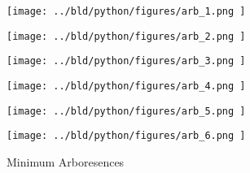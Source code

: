 \documentclass[11pt, a4paper, leqno]{article}
\begin{document}
\newpage

\begin{figure}
    \centering
    \begin{minipage}{.5\textwidth}
        \centering
        \texttt{[image: ../bld/python/figures/arb\_1.png
        ]}
        \label{fig:arb2}
    \end{minipage}%
    \begin{minipage}{.5\textwidth}
        \centering
        \texttt{[image: ../bld/python/figures/arb\_2.png
        ]}
        \label{fig:arb3}
    \end{minipage}

    \centering
    \begin{minipage}{.5\textwidth}
        \centering
        \texttt{[image: ../bld/python/figures/arb\_3.png
        ]}
        \label{fig:arb4}
    \end{minipage}%
    \begin{minipage}{.5\textwidth}
        \centering
        \texttt{[image: ../bld/python/figures/arb\_4.png
        ]}
        \label{fig:arb5}
    \end{minipage}


    \centering
    \begin{minipage}{.5\textwidth}
        \centering
        \texttt{[image: ../bld/python/figures/arb\_5.png
        ]}
        \label{fig:arb6}
    \end{minipage}%
    \begin{minipage}{.5\textwidth}
        \centering
        \texttt{[image: ../bld/python/figures/arb\_6.png
        ]}
        \label{fig:arb7}
    \end{minipage}
    \caption{Minimum Arboresences}

\end{figure}
















\end{document}
